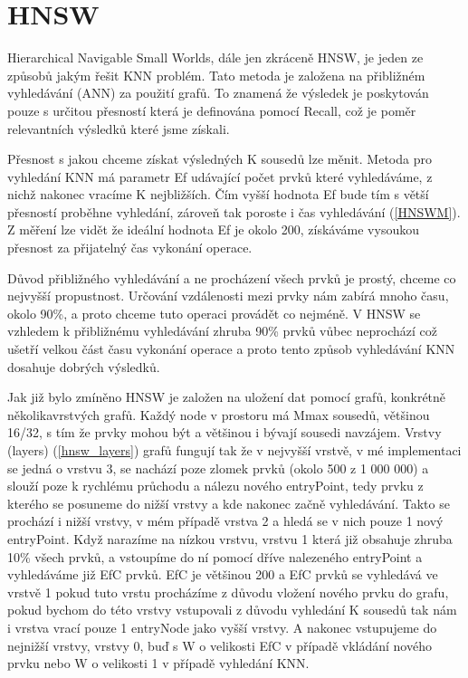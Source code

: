 \documentclass[czech,semestral,dept460,male,csharp,cpdeclaration]{diploma}
\begin{document}
	\chapter{HNSW}
	
		Hierarchical Navigable Small Worlds, dále jen zkráceně HNSW, je jeden ze způsobů jakým řešit KNN problém. Tato metoda je založena na přibližném vyhledávání (ANN) za použití grafů. To znamená že výsledek je poskytován pouze s určitou přesností která je definována pomocí Recall, což je poměr relevantních výsledků které jsme získali.
		
		Přesnost s jakou chceme získat výsledných K sousedů lze měnit. Metoda pro vyhledání KNN má parametr Ef udávající počet prvků které vyhledáváme, z nichž nakonec vracíme K nejbližších. Čím vyšší hodnota Ef bude tím s větší přesností proběhne vyhledání, zároveň tak poroste i čas vyhledávání (\ref{HNSWM}). Z měření lze vidět že ideální hodnota Ef je okolo 200, získáváme vysoukou přesnost za přijatelný čas vykonání operace.
		
		Důvod přibližného vyhledávání a ne procházení všech prvků je prostý, chceme co nejvyšší propustnost. Určování vzdálenosti mezi prvky nám zabírá mnoho času, okolo 90\%, a proto chceme tuto operaci provádět co nejméně. V HNSW se vzhledem k přibližnému vyhledávání zhruba 90\% prvků vůbec neprochází což ušetří velkou část času vykonání operace a proto tento způsob vyhledávání KNN dosahuje dobrých výsledků.
		
		Jak již bylo zmíněno HNSW je založen na uložení dat pomocí grafů, konkrétně několikavrstvých grafů. Každý node v prostoru má Mmax sousedů, většinou 16/32, s tím že prvky mohou být a většinou i bývají sousedi navzájem. Vrstvy (layers) (\ref{hnsw_layers}) grafů fungují tak že v nejvyšší vrstvě, v mé implementaci se jedná o vrstvu 3, se nachází poze zlomek prvků (okolo 500 z 1 000 000) a slouží poze k rychlému průchodu a nálezu nového entryPoint, tedy prvku z kterého se posuneme do nižší vrstvy a kde nakonec začně vyhledávání. Takto se prochází i nižší vrstvy, v mém případě vrstva 2 a hledá se v nich pouze 1 nový entryPoint. Když narazíme na nízkou vrstvu, vrstvu 1 která již obsahuje zhruba 10\% všech prvků, a vstoupíme do ní pomocí dříve nalezeného entryPoint a vyhledáváme již EfC prvků. EfC je většinou 200 a EfC prvků se vyhledává ve vrstvě 1 pokud tuto vrstu procházíme z důvodu vložení nového prvku do grafu, pokud bychom do této vrstvy vstupovali z důvodu vyhledání K sousedů tak nám i vrstva vrací pouze 1 entryNode jako vyšší vrstvy. A nakonec vstupujeme do nejnižší vrstvy, vrstvy 0, buď s W o velikosti EfC v případě vkládání nového prvku nebo W o velikosti 1 v případě vyhledání KNN.
		
\end{document}
